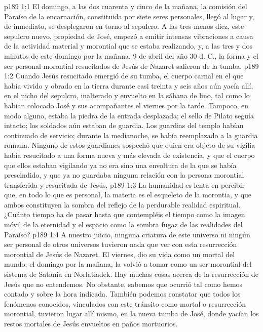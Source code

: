 \vs p189 1:1 El domingo, a las dos cuarenta y cinco de la mañana, la comisión del Paraíso de la encarnación, constituida por siete seres personales, llegó al lugar y, de inmediato, se desplegaron en torno al sepulcro. A las tres menos diez, este sepulcro nuevo, propiedad de José, empezó a emitir intensas vibraciones a causa de la actividad material y morontial que se estaba realizando, y, a las tres y dos minutos de este domingo por la mañana, 9 de abril del año 30 d. C., la forma y el ser personal morontial resucitados de Jesús de Nazaret salieron de la tumba.
\vs p189 1:2 Cuando Jesús resucitado emergió de su tumba, el cuerpo carnal en el que había vivido y obrado en la tierra durante casi treinta y seis años aún yacía allí, en el nicho del sepulcro, inalterado y envuelto en la sábana de lino, tal como lo habían colocado José y sus acompañantes el viernes por la tarde. Tampoco, en modo alguno, estaba la piedra de la entrada desplazada; el sello de Pilato seguía intacto; los soldados aún estaban de guardia. Los guardias del templo habían continuado de servicio; durante la medianoche, se había reemplazado a la guardia romana. Ninguno de estos guardianes sospechó que quien era objeto de su vigilia había resucitado a una forma nueva y más elevada de existencia, y que el cuerpo que ellos estaban vigilando ya no era sino una envoltura de la que se había prescindido, y que ya no guardaba ninguna relación con la persona morontial transferida y resucitada de Jesús.
\vs p189 1:3 \pc La humanidad es lenta en percibir que, en todo lo que es personal, la materia es el esqueleto de la morontia, y que ambos constituyen la sombra del reflejo de la perdurable realidad espiritual. ¿Cuánto tiempo ha de pasar hasta que contempléis el tiempo como la imagen móvil de la eternidad y el espacio como la sombra fugaz de las realidades del Paraíso?
\vs p189 1:4 A nuestro juicio, ninguna criatura de este universo ni ningún ser personal de otros universos tuvieron nada que ver con esta resurrección morontial de Jesús de Nazaret. El viernes, dio su vida como un mortal del mundo; el domingo por la mañana, la volvió a tomar como un ser morontial del sistema de Satania en Norlatiadek. Hay muchas cosas acerca de la resurrección de Jesús que no entendemos. No obstante, sabemos que ocurrió tal como hemos contado y sobre la hora indicada. También podemos constatar que todos los fenómenos conocidos, vinculados con este tránsito como mortal o resurrección morontial, tuvieron lugar allí mismo, en la nueva tumba de José, donde yacían los restos mortales de Jesús envueltos en paños mortuorios.
